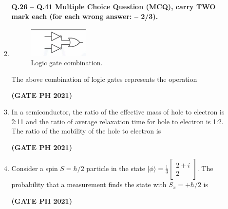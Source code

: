 \documentclass[14pt, a4paper]{extarticle}
\begin{document}
\begin{enumerate}[label=\textbf{Q.\arabic*}]
\begin{enumerate}[label=\textbf{Q.\arabic*}]
\textbf{Q.26 – Q.41 Multiple Choice Question (MCQ), carry TWO mark each (for each wrong answer: – 2/3).}

\item
\begin{figure}[H]
\centering
\includegraphics[width=0.3\textwidth]{figs/q36fig21.png}
\caption{Logic gate combination.}
\label{fig:q26ph}
\end{figure}
The above combination of logic gates represents the operation
\begin{enumerate}
\end{enumerate}
\hfill \textbf{(GATE PH 2021)}

\item In a semiconductor, the ratio of the effective mass of hole to electron is 2:11 and the ratio of average relaxation time for hole to electron is 1:2. The ratio of the mobility of the hole to electron is
\begin{enumerate}
\end{enumerate}
\hfill \textbf{(GATE PH 2021)}

\item Consider a spin $S = \hbar/2$ particle in the state $|\phi\rangle = \frac{1}{3}\begin{bmatrix} 2+i \\ 2 \end{bmatrix}$. The probability that a measurement finds the state with $S_x = +\hbar/2$ is
\begin{enumerate}
\end{enumerate}
\hfill \textbf{(GATE PH 2021)}


\end{enumerate}
\end{enumerate}
\end{document}
